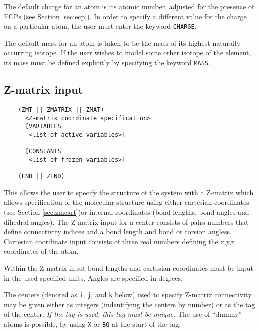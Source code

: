 The default charge for an atom is its atomic number, adjusted for the
presence of ECPs (see Section \ref{sec:ecp}).  In order to specify a
different value for the charge on a particular atom, the user must
enter the keyword \verb+CHARGE+.

The default mass for an atom is taken to be the mass of its highest
naturally occurring isotope.  If the user wishes to model some other
isotope of the element, its mass must be defined explicitly by
specifying the keyword \verb+MASS+.


\subsection{Z-matrix input}
\label{sec:Z-matrix}

\begin{verbatim}
    (ZMT || ZMATRIX || ZMAT)
      <Z-matrix coordinate specification>
      [VARIABLES
       <list of active variables>]

      [CONSTANTS
       <list of frozen variables>]

    (END || ZEND)
\end{verbatim}

This allows the user to specify the structure of the system with a
Z-matrix which allows specification of the molecular structure using
either cartesian coordinates (see Section \ref{sec:zmcart})or internal
coordinates (bond lengths, bond angles and dihedral angles).  The
Z-matrix input for a center consists of pairs numbers that define
connectivity indices and a bond length and bond or torsion angless.
Cartesian coordinate input consists of three real numbers defining the
x,y,z coordinates of the atom.  

Within the Z-matrix input bond lengths and cartesian coordinates must
be input in the used specified units.  Angles are specified in
degrees.


The centers (denoted as \verb+i+, \verb+j+, and \verb+k+ below) used
to specify Z-matrix connectivity may be given either as integers
(indentifying the centers by number) or as the tag of the center.
{\em If the tag is used, this tag must be unique.} The use of
``dummy'' atoms is possible, by using \verb+X+ or \verb+BQ+ at the
start of the tag.

